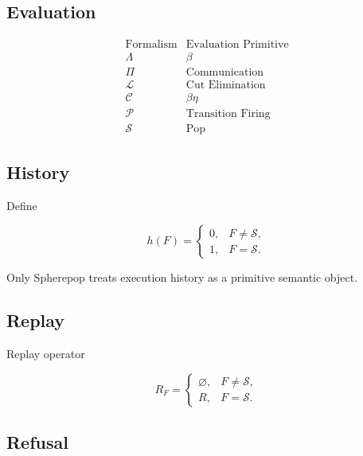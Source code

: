 \documentclass[12pt,oneside]{article}
\theoremstyle{definition}
\theoremstyle{remark}
\begin{document}
\subsection*{Evaluation}

\[
\begin{array}{c|c}
\text{Formalism}
&
\text{Evaluation Primitive}
\\
\hline
\Lambda
&
\beta
\\
\Pi
&
\text{Communication}
\\
\mathcal L
&
\text{Cut Elimination}
\\
\mathcal C
&
\beta\eta
\\
\mathcal P
&
\text{Transition Firing}
\\
\mathcal S
&
\operatorname{Pop}
\end{array}
\]

\subsection*{History}

Define

\[
h(F)
=
\begin{cases}
0,&F\neq\mathcal S,\\
1,&F=\mathcal S.
\end{cases}
\]

Only Spherepop treats execution history as a primitive semantic object.

\subsection*{Replay}

Replay operator

\[
R_F
=
\begin{cases}
\varnothing,&F\neq\mathcal S,\\
R,&F=\mathcal S.
\end{cases}
\]

\subsection*{Refusal}
\end{document}
